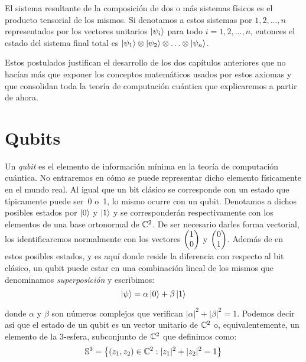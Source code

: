 \begin{postulate} El sistema resultante de la composición de dos o más sistemas físicos es el producto tensorial de los mismos. Si denotamos a estos sistemas por $1,2,...,n$ representados por los vectores unitarios $\left|\psi_i\right\rangle$ para todo $i=1,2,...,n$, entonces el estado del sistema final total es $\left|\psi_1\right\rangle\otimes\left|\psi_2\right\rangle\otimes\hdots\otimes\left|\psi_n\right\rangle$.

Estos postulados justifican el desarrollo de los dos capítulos anteriores que no hacían más que exponer los conceptos matemáticos usados por estos axiomas y que consolidan toda la teoría de computación cuántica que explicaremos a partir de ahora.
\end{postulate}

\section{Qubits}
\label{sec:sec43}

Un \textit{qubit}  es el elemento de información mínima en la teoría de computación cuántica. No entraremos en cómo se puede representar dicho elemento físicamente en el mundo real. Al igual que un bit clásico se corresponde con un estado que típicamente puede ser~0 o~1, lo mismo ocurre con un qubit. Denotamos a dichos posibles estados por $\left|0\right\rangle$ y $\left|1\right\rangle$ y se corresponderán respectivamente con los elementos de una base ortonormal de $\mathbb{C}^2$. De ser necesario darles forma vectorial, los identificaremos normalmente con los vectores $\begin{pmatrix} 1 \\ 0 \end{pmatrix}$ y $\begin{pmatrix} 0 \\ 1 \end{pmatrix}$. Además de en estos posibles estados, y es aquí donde reside la diferencia con respecto al bit clásico, un qubit puede estar en una combinación lineal de los mismos que denominamos \textit{superposición} y escribimos:
\[\left|\psi\right\rangle=\alpha\left|0\right\rangle+\beta\left|1\right\rangle\]

\noindent donde $\alpha$ y $\beta$ son números complejos que verifican $|\alpha|^2+|\beta|^2=1$. Podemos decir así que el estado de un qubit es un vector unitario de $\mathbb{C}^2$ o, equivalentemente, un elemento de la 3-esfera, subconjunto de $\mathbb{C}^2$ que definimos como:
\[\mathbb{S}^3=\left\{ (z_1,z_2)\in\mathbb{C}^2:|z_1|^2+|z_2|^2=1 \right\}\]

